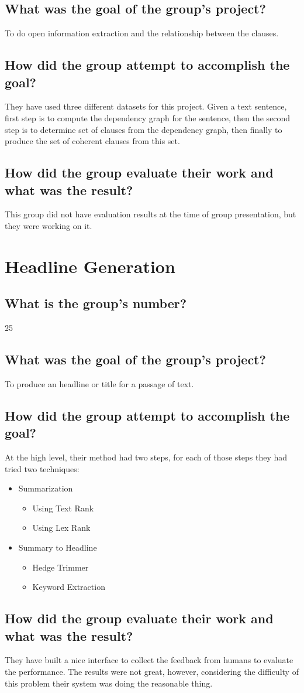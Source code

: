 \documentclass[letterpaper]{article}
\begin{document}
\subsection{What was the goal of the group's project?}
To do open information extraction and the relationship between the clauses.
\subsection{How did the group attempt to accomplish the goal?}
They have used three different datasets for this project.
Given a text sentence, first step is to compute the dependency graph for the sentence, then the second step is to determine set of clauses from the dependency graph, then finally to produce the set of coherent clauses from this set.

\subsection{How did the group evaluate their work and what was the result?}
This group did not have evaluation results at the time of group presentation, but they were working on it. 

\section{Headline Generation}
\subsection{What is the group's number?}
25
\subsection{What was the goal of the group's project?}
To produce an headline or title for a passage of text.

\subsection{How did the group attempt to accomplish the goal?}
At the high level, their method had two steps, for each of those steps they had tried two techniques:

\begin{itemize}
	\item Summarization
	\begin{itemize}
		\item Using Text Rank
		\item Using Lex Rank
	\end{itemize}
	\item Summary to Headline
		\begin{itemize}
		\item Hedge Trimmer
		\item Keyword Extraction
	\end{itemize}
\end{itemize}

\subsection{How did the group evaluate their work and what was the result?}
They have built a nice interface to collect the feedback from humans to evaluate the performance. The results were not great, however, considering the difficulty of this problem their system was doing the reasonable thing.
\end{document}
